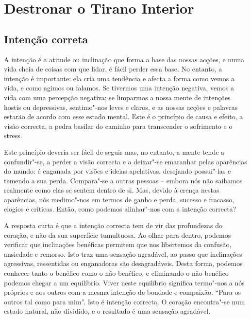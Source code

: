 \chapter{Destronar o Tirano Interior}

\section{Intenção correta}

A intenção é a atitude ou inclinação que forma a base das nossas acções,
e numa vida cheia de coisas com que lidar, é fácil perder essa base. No
entanto, a intenção é importante: ela cria uma tendência e afecta a
forma como vemos a vida, e como agimos ou falamos. Se tivermos uma
intenção negativa, vemos a vida com uma percepção negativa; se limparmos
a nossa mente de intenções hostis ou depressivas, sentimo"-nos leves e
claros, e as nossas acções e palavras estarão de acordo com esse estado
mental. Este é o princípio de causa e efeito, a visão correcta, a pedra
basilar do caminho para transcender o sofrimento e o stress.

Este princípio deveria ser fácil de seguir mas, no entanto, a mente
tende a confundir"-se, a perder a visão correcta e a deixar"-se emaranhar
pelas aparências do mundo: é enganada por visões e ideias apelativas,
desejando possuí"-las e temendo a sua perda. Compara"-se a outras pessoas
-- embora nós não saibamos realmente como elas se sentem dentro de si.
Mas, devido à crença nestas aparências, nós medimo"-nos em termos de
ganho e perda, sucesso e fracasso, elogios e críticas. Então, como
podemos alinhar"-nos com a intenção correcta?

\sectionBreak

A resposta curta é que a intenção correcta tem de vir das profundezas do
coração, e não da sua superfície tumultuosa. Ao olhar para dentro,
podemos verificar que inclinações benéficas permitem que nos libertemos
da confusão, ansiedade e remorso. Isto traz uma sensação agradável, ao
passo que inclinações agressivas, ressentidas ou enganadoras são
desagradáveis. Desta forma, podemos conhecer tanto o benéfico como o não
benéfico, e eliminando o não benéfico podemos chegar a um equilíbrio.
Viver neste equilíbrio significa termo"-nos a nós próprios e aos outros
com a mesma intenção de bondade e compaixão: “Para os outros tal como
para mim”. Isto é intenção correcta. O coração encontra"-se num estado
natural, não dividido, e o resultado é uma sensação agradável.

